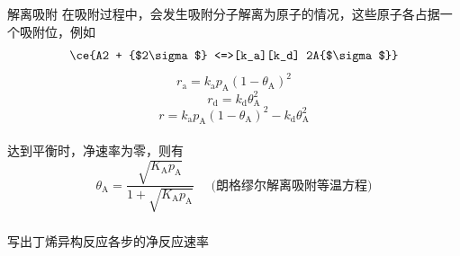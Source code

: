 \begin{frame}{解离吸附}
    在吸附过程中，会发生吸附分子解离为原子的情况，这些原子各占据一个吸附位，例如
    $$\ce{A2 + {$2\sigma$} <=>[k_a][k_d] 2A{$\sigma$}}$$
    $$r_\mathrm{a}=k_\mathrm{a}p_\mathrm{A}(1-\theta_\mathrm{A})^2$$
    $$r_\mathrm{d}=k_\mathrm{d}\theta_\mathrm{A}^2$$
    $$r=k_\mathrm{a}p_\mathrm{A}(1-\theta_\mathrm{A})^2-k_\mathrm{d}\theta_\mathrm{A}^2$$
    \\达到平衡时，净速率为零，则有
    $$\theta_\mathrm{A}=\frac{\sqrt{K_\mathrm{A}p_\mathrm{A}}}{1+\sqrt{K_\mathrm{A}p_\mathrm{A}}} \text{~~~~(朗格缪尔解离吸附等温方程)}$$
\end{frame}


\begin{frame}[t]
    \frametitle{}
    \begin{redblock}{写出丁烯异构反应各步的净反应速率}
        \begin{minipage}{0.48\linewidth}
\end{minipage}
\end{redblock}
\end{frame}
